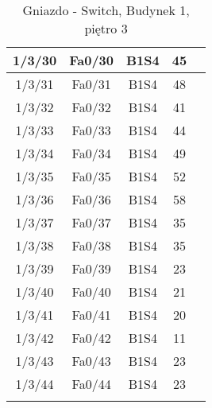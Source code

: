 \begin{center}
\begin{longtable}{|c|c|c|c|c|}
	1/3/30 & Fa0/30 & B1S4 & 45 \\ \hline
	1/3/31 & Fa0/31 & B1S4 & 48 \\ \hline
	1/3/32 & Fa0/32 & B1S4 & 41 \\ \hline
	1/3/33 & Fa0/33 & B1S4 & 44 \\ \hline
	1/3/34 & Fa0/34 & B1S4 & 49 \\ \hline
	1/3/35 & Fa0/35 & B1S4 & 52 \\ \hline
	1/3/36 & Fa0/36 & B1S4 & 58 \\ \hline
	1/3/37 & Fa0/37 & B1S4 & 35 \\ \hline
	1/3/38 & Fa0/38 & B1S4 & 35 \\ \hline
	1/3/39 & Fa0/39 & B1S4 & 23 \\ \hline
	1/3/40 & Fa0/40 & B1S4 & 21 \\ \hline
	1/3/41 & Fa0/41 & B1S4 & 20 \\ \hline
	1/3/42 & Fa0/42 & B1S4 & 11 \\ \hline
	1/3/43 & Fa0/43 & B1S4 & 23 \\ \hline
	1/3/44 & Fa0/44 & B1S4 & 23 \\ \hline
	\caption{Gniazdo - Switch, Budynek 1, piętro 3}\\
    \end{longtable}
\end{center}


